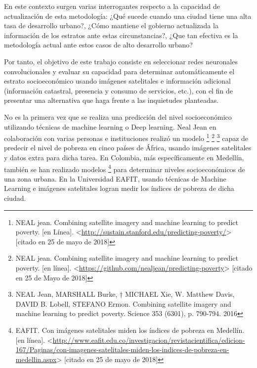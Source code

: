 En este contexto surgen varias interrogantes respecto a la capacidad de actualización de esta metodología: ¿Qué sucede cuando una ciudad tiene una alta tasa de desarrollo urbano?, ¿Cómo mantiene el gobierno actualizada la información de los estratos ante estas circunstancias?, ¿Que tan efectiva es la metodología actual ante estos casos de alto desarrollo urbano?
   
Por tanto, el objetivo de este trabajo consiste en seleccionar redes neuronales convolucionales y evaluar su capacidad para determinar automáticamente el estrato socioeconómico usando imágenes satelitales e información adicional (información catastral, presencia y consumo de servicios, etc.), con el fin de presentar una alternativa que haga frente a las inquietudes planteadas.
    
No es la primera vez que se realiza una predicción del nivel socioeconómico utilizando técnicas de machine learning o Deep learning. Neal Jean en colaboración con varias personas e instituciones realizó un modelo \footnote[4]{NEAL jean. Combining satellite imagery and machine learning to predict poverty. [en Línea]. <\url{http://sustain.stanford.edu/predicting-poverty/}> [citado en 25 de mayo de 2018]} \footnote[5]{NEAL jean. Combining satellite imagery and machine learning to predict poverty. [en línea]. <\url{https://github.com/nealjean/predicting-poverty}> [citado en 25 de Mayo de 2018]} \footnote[6]{NEAL Jean, MARSHALL Burke, † MICHAEL Xie, W. Matthew Davis, DAVID B. Lobell, STEFANO Ermon. Combining satellite imagery and machine learning to predict poverty. Science 353 (6301), p. 790-794. 2016} capaz de predecir el nivel de pobreza en cinco países de África, usando imágenes satelitales y datos extra para dicha tarea. En Colombia, más específicamente en Medellín, también se han realizado modelos \footnote[7]{EAFIT. Con imágenes satelitales miden los índices de pobreza en Medellín. [en línea]. <\url{http://www.eafit.edu.co/investigacion/revistacientifica/edicion-167/Paginas/con-imagenes-satelitales-miden-los-indices-de-pobreza-en-medellin.aspx}> [citado en 25 de mayo de 2018]} para determinar niveles socioeconómicos de una zona urbana. En la Universidad EAFIT, usando técnicas de Machine Learning e imágenes satelitales logran medir los índices de pobreza de dicha ciudad.
    
    
    
    

